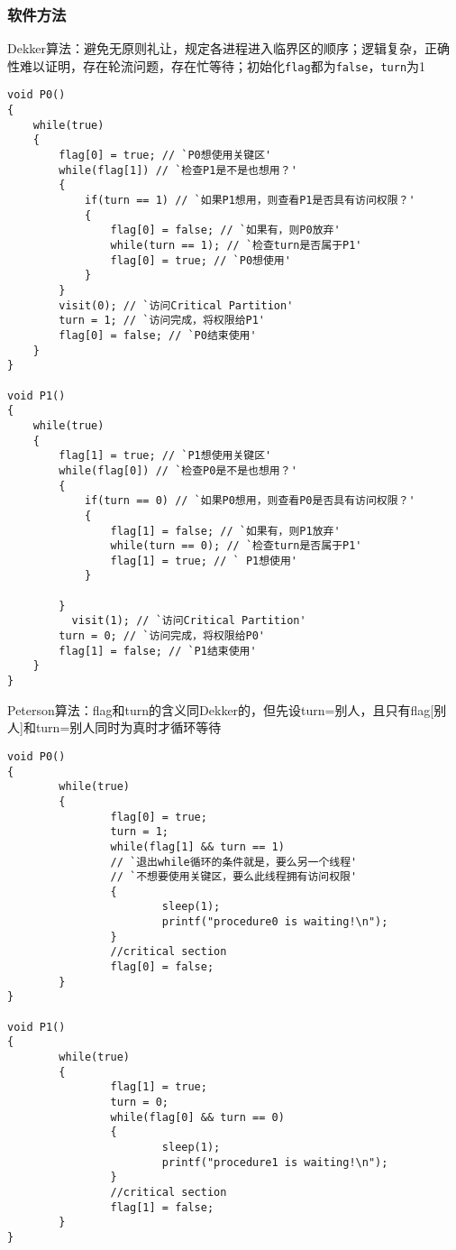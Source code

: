 \subsubsection{软件方法}
Dekker算法：避免无原则礼让，规定各进程进入临界区的顺序；逻辑复杂，正确性难以证明，存在轮流问题，存在忙等待；初始化\verb'flag'都为\verb'false'，\verb'turn'为1
\begin{lstlisting}
void P0()
{
	while(true)
	{
		flag[0] = true; // `P0想使用关键区'
		while(flag[1]) // `检查P1是不是也想用？'
		{
			if(turn == 1) // `如果P1想用，则查看P1是否具有访问权限？'
			{
				flag[0] = false; // `如果有，则P0放弃'
				while(turn == 1); // `检查turn是否属于P1'
				flag[0] = true; // `P0想使用'
			}
		}
		visit(0); // `访问Critical Partition'
		turn = 1; // `访问完成，将权限给P1'
		flag[0] = false; // `P0结束使用'
	}
}

void P1()
{
	while(true)
	{
		flag[1] = true; // `P1想使用关键区'
		while(flag[0]) // `检查P0是不是也想用？'
		{
			if(turn == 0) // `如果P0想用，则查看P0是否具有访问权限？'
			{
				flag[1] = false; // `如果有，则P1放弃'
				while(turn == 0); // `检查turn是否属于P1'
				flag[1] = true; // ` P1想使用'
			}

		}
		  visit(1); // `访问Critical Partition'
		turn = 0; // `访问完成，将权限给P0'
		flag[1] = false; // `P1结束使用'
	}
}
\end{lstlisting}

Peterson算法：flag和turn的含义同Dekker的，但先设turn=别人，且只有flag[别人]和turn=别人同时为真时才循环等待
\begin{lstlisting}
void P0()
{
        while(true)
        {
                flag[0] = true;
                turn = 1;
                while(flag[1] && turn == 1)
                // `退出while循环的条件就是，要么另一个线程'
                // `不想要使用关键区，要么此线程拥有访问权限'
                {
                        sleep(1);
                        printf("procedure0 is waiting!\n");
                }
                //critical section
                flag[0] = false;
        }
}

void P1()
{
        while(true)
        {
                flag[1] = true;
                turn = 0;
                while(flag[0] && turn == 0)
                {
                        sleep(1);
                        printf("procedure1 is waiting!\n");
                }
                //critical section
                flag[1] = false;
        }
}
\end{lstlisting}

